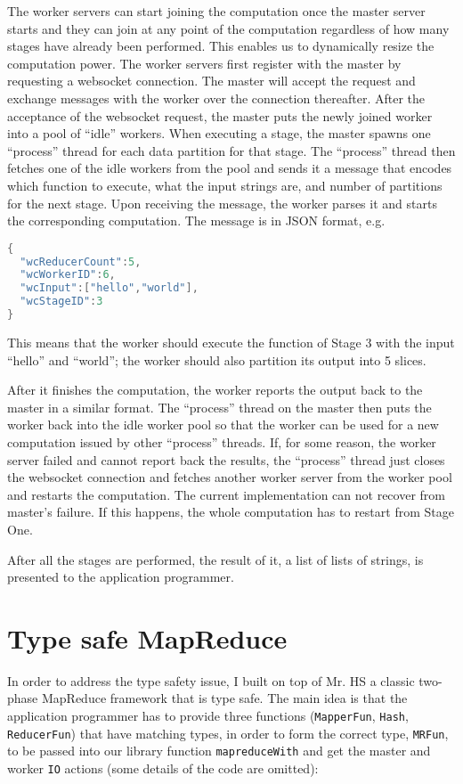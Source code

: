 \documentclass[a4paper]{article}
\begin{document}
The worker servers can start joining the computation once the 
master server starts and they can join at any point of the computation regardless
of how many stages have already been performed. This enables us
to dynamically resize the computation power.
The worker servers first register with the master by requesting a websocket connection.
The master will accept the request and 
exchange messages with the worker over
the connection thereafter.
After the acceptance of the websocket request, 
the master puts the newly joined worker into a pool of ``idle'' workers.
When executing a stage, the master spawns one ``process'' thread for each 
data partition for that stage. The ``process'' thread then fetches one of the idle
workers from the pool and sends it a message 
that encodes which function to execute,
what the input strings are, and number of partitions for the next stage.
Upon receiving the message, the worker parses it
and starts the corresponding computation.
The message is in JSON format, 
e.g.
\begin{lstlisting}[language=java]
{
  "wcReducerCount":5,
  "wcWorkerID":6,
  "wcInput":["hello","world"],
  "wcStageID":3
}
\end{lstlisting}
This means that the worker should execute the function of Stage 3
with the input ``hello'' and ``world''; the worker should 
also partition its output into 5 slices.

After it finishes the computation, the worker reports the output back 
to the master in a similar format. The ``process'' thread on the 
master then puts the worker back into the idle worker pool 
so that the worker can be used for a new computation issued 
by other ``process'' threads. If, for some reason, the worker
server failed and cannot report back the results, the ``process''
thread just closes the websocket connection and fetches another 
worker server from the worker pool and restarts the computation.
The current implementation can not recover
from master's failure. If this happens, the whole computation
has to restart from Stage One.


After all the stages are performed, the result of it, a list of lists 
of strings, is 
presented to the application programmer.


\section{Type safe MapReduce}
In order to address the type safety
issue, I built on top of Mr. HS
 a classic two-phase MapReduce framework 
that is type safe. The main idea is that
the application programmer has to provide three functions 
(\texttt{MapperFun}, \texttt{Hash}, \texttt{ReducerFun})
that have matching types,
in order to form the correct type, \texttt{MRFun}, to be passed into
our library function \texttt{mapreduceWith} and
get the master and worker \texttt{IO} actions (some details of the code are omitted):
\end{document}
